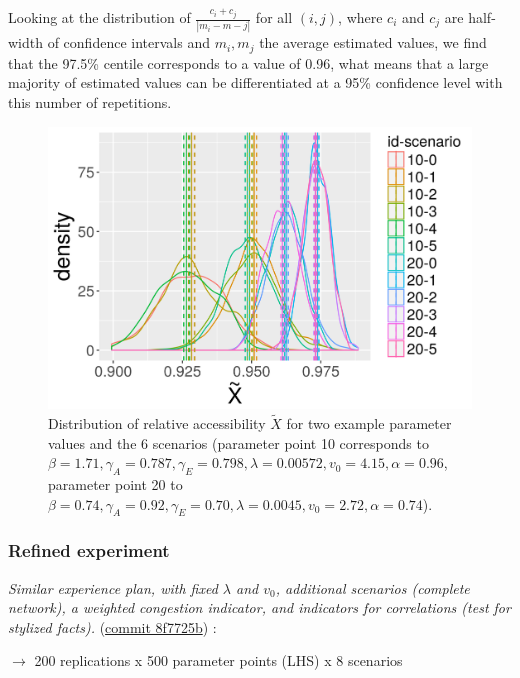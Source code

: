 Looking at the distribution of $\frac{c_i + c_j}{\left|m_i - m-j\right|}$ for all $(i,j)$, where $c_i$ and $c_j$ are half-width of confidence intervals and $m_i,m_j$ the average estimated values, we find that the 97.5\% centile corresponds to a value of 0.96, what means that a large majority of estimated values can be differentiated at a 95\% confidence level with this number of repetitions.


\begin{figure}
	\includegraphics[width=\textwidth]{figures/20180417_184334_SPACEMATTERS_distrib_relativeAccessibility.png}
	\caption{Distribution of relative accessibility $\tilde{X}$ for two example parameter values and the 6 scenarios (parameter point 10 corresponds to $\beta = 1.71,\gamma_A=0.787,\gamma_E=0.798,\lambda=0.00572,v_0=4.15,\alpha=0.96$, parameter point 20 to $\beta = 0.74,\gamma_A=0.92,\gamma_E=0.70,\lambda=0.0045,v_0=2.72,\alpha=0.74$).\label{fig:distrib-access}}
\end{figure}



\subsubsection{Refined experiment}

\textit{Similar experience plan, with fixed $\lambda$ and $v_0$, additional scenarios (complete network), a weighted congestion indicator, and indicators for correlations (test for stylized facts).} (\href{https://github.com/JusteRaimbault/Governance/commit/8f7725b982bfb3bce51a58fbd516d690556abf89}{commit 8f7725b}) :

$\rightarrow$ 200 replications x 500 parameter points (LHS) x 8 scenarios

